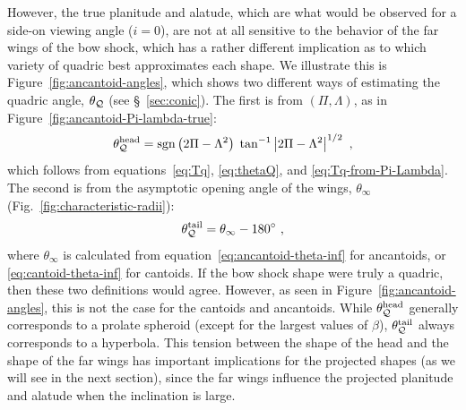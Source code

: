 However, the true planitude and alatude, which are what would be
observed for a side-on viewing angle (\(i = 0\)), are not at all
sensitive to the behavior of the far wings of the bow shock, which has
a rather different implication as to which variety of quadric best
approximates each shape.  We illustrate this is
Figure~\ref{fig:ancantoid-angles}, which shows two different ways of
estimating the quadric angle, \(\theta_{\mathcal{Q}}\) (see \S~\ref{sec:conic}).
The first is from \((\Pi, \Lambda)\), as in
Figure~\ref{fig:ancantoid-Pi-lambda-true}:
\newcommand\head{^{\text{head}}}
\newcommand\tail{^{\text{tail}}}
\begin{equation}
  \label{eq:thetaQ-head}
  \theta_{\Q}\head =
  \sgn{\bigl(2 \Pi - \Lambda^2\bigr)} \;
  \tan^{-1} \Abs{2\Pi - \Lambda^2}^{1/2} \ ,
\end{equation}
which follows from equations~\eqref{eq:Tq}, \eqref{eq:thetaQ}, and
\eqref{eq:Tq-from-Pi-Lambda}.  The second is from the asymptotic
opening angle of the wings, \(\theta_\infty\) (Fig.~\ref{fig:characteristic-radii}):
\begin{equation}
  \label{eq:thetaQ-tail}
  \theta_{\Q}\tail = \theta_\infty - 180^\circ \ , 
\end{equation}
where \(\theta_\infty\) is calculated from
equation~\eqref{eq:ancantoid-theta-inf} for ancantoids, or
\eqref{eq:cantoid-theta-inf} for cantoids.  If the bow shock shape
were truly a quadric, then these two definitions would agree.
However, as seen in Figure~\ref{fig:ancantoid-angles}, this is not the
case for the cantoids and ancantoids.  While
\(\smash[b]{\theta_{\Q}\head}\) generally corresponds to a prolate spheroid
(except for the largest values of \(\beta\)),
\(\smash[b]{\theta_{\Q}\tail}\) always corresponds to a hyperbola.  This
tension between the shape of the head and the shape of the far wings
has important implications for the projected shapes (as we will see in
the next section), since the far wings influence the projected
planitude and alatude when the inclination is large.




